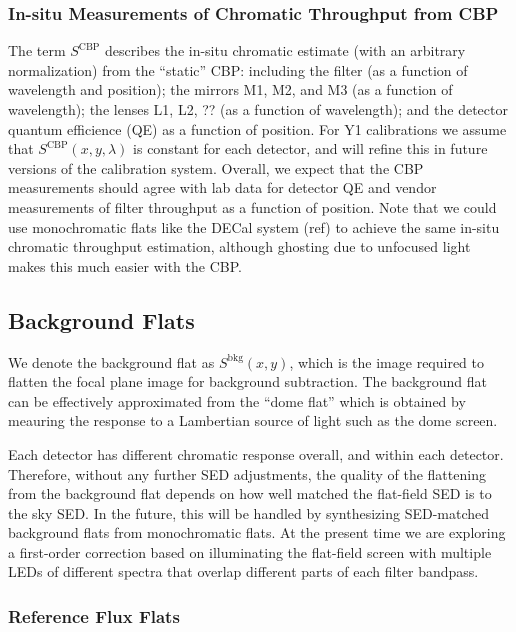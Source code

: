 \documentclass[SE,authoryear,lsstdraft,toc]{lsstdoc}
\begin{document}
\subsubsection{In-situ Measurements of Chromatic Throughput from CBP}

The term $S^{\mathrm{CBP}}$ describes the in-situ chromatic estimate (with an
arbitrary normalization) from the ``static'' CBP: including the filter (as a
function of wavelength and position); the mirrors M1, M2, and M3 (as a function
of wavelength); the lenses L1, L2, ?? (as a function of wavelength); and the
detector quantum efficience (QE) as a function of position.  For Y1
calibrations we assume that $S^{\mathrm{CBP}}(x, y, \lambda)$ is constant for each
detector, and will refine this in future versions of the calibration system.
Overall, we expect that the CBP measurements should agree with lab data for
detector QE and vendor measurements of filter throughput as a function of
position.  Note that we could use monochromatic flats like the DECal system
(ref) to achieve the same in-situ chromatic throughput estimation, although
ghosting due to unfocused light makes this much easier with the CBP.

\subsection{Background Flats}
\label{sec:photom:bkgflat}

We denote the background flat as $S^{\mathrm{bkg}}(x,y)$, which is the image required to flatten the focal plane image for background subtraction.
The background flat can be effectively approximated from the ``dome flat'' which is obtained by meauring the response to a Lambertian source of light such as the dome screen.

Each detector has different chromatic response overall, and within each detector.
Therefore, without any further SED adjustments, the quality of the flattening from the background flat depends on how well matched the flat-field SED is to the sky SED.
In the future, this will be handled by synthesizing SED-matched background flats from monochromatic flats.
At the present time we are exploring a first-order correction based on illuminating the flat-field screen with multiple LEDs of different spectra that overlap different parts of each filter bandpass.

\subsubsection{Reference Flux Flats}
\label{sec:photom:reffluxflat}
\end{document}

